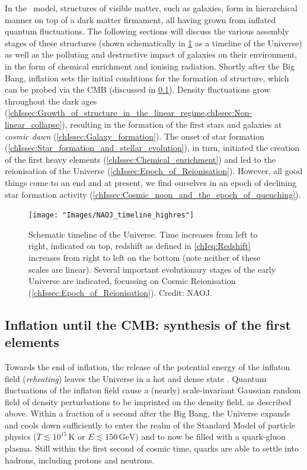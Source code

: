 In the \LCDM\ model, structures of visible matter, such as galaxies, form in hierarchical manner on top of a dark matter firmament, all having grown from inflated quantum fluctuations. The following sections will discuss the various assembly stages of these structures (shown schematically in \cref{chIfig:Cosmic_timeline} as a timeline of the Universe) as well as the polluting and destructive impact of galaxies on their environment, in the form of chemical enrichment and ionising radiation. Shortly after the Big Bang, inflation sets the initial conditions for the formation of structure, which can be probed via the CMB (discussed in \cref{chIssec:Inflation_until_CMB}). Density fluctuations grow throughout the dark ages (\cref{chIssec:Growth_of_structure_in_the_linear_regime,chIssec:Non-linear_collapse}), resulting in the formation of the first stars and galaxies at \textit{cosmic dawn} (\cref{chIssec:Galaxy_formation}). The onset of star formation (\cref{chIssec:Star_formation_and_stellar_evolution}), in turn, initiated the creation of the first heavy elements (\cref{chIssec:Chemical_enrichment}) and led to the reionisation of the Universe (\cref{chIssec:Epoch_of_Reionisation}). However, all good things come to an end and at present, we find ourselves in an epoch of declining star formation activity (\cref{chIssec:Cosmic_noon_and_the_epoch_of_quenching}).
\begin{figure}[t]
    \centering
    \texttt{[image: "Images/NAOJ\_timeline\_highres"]}
    \caption[Schematic timeline of the Universe]
    {Schematic timeline of the Universe. Time increases from left to right, indicated on top, redshift as defined in \cref{chIeq:Redshift} increases from right to left on the bottom (note neither of these scales are linear). Several important evolutionary stages of the early Universe are indicated, focussing on Cosmic Reionisation (\cref{chIssec:Epoch_of_Reionisation}). Credit: NAOJ.}
    \label{chIfig:Cosmic_timeline}
\end{figure}

\subsection{Inflation until the CMB: synthesis of the first elements}
\label{chIssec:Inflation_until_CMB}

Towards the end of inflation, the release of the potential energy of the inflaton field (\textit{reheating}) leaves the Universe in a hot and dense state \citep[ultimately the source of the blackbody nature of the CMB;][]{1994PhRvL..73.3195K}. Quantum fluctuations of the inflaton field cause a (nearly) scale-invariant Gaussian random field of density perturbations to be imprinted on the density field, as described above. Within a fraction of a second after the Big Bang, the Universe expands and cools down sufficiently to enter the realm of the Standard Model of particle physics ($T \lesssim 10^{15} \, \mathrm{K}$ or $E \lesssim 150 \, \mathrm{GeV}$) and to now be filled with a quark-gluon plasma. Still within the first second of cosmic time, quarks are able to settle into hadrons, including protons and neutrons.

